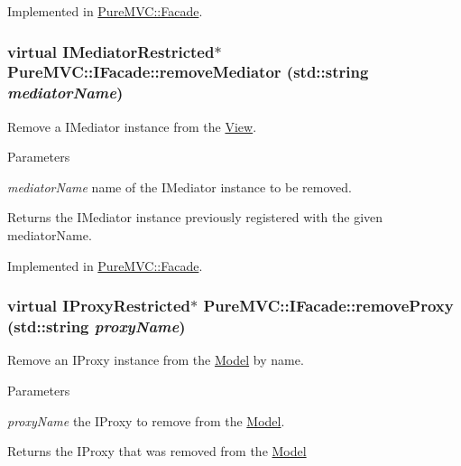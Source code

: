 Implemented in \hyperlink{class_pure_m_v_c_1_1_facade_aa99976fe908bef0b08642906b02e2af3}{PureMVC::Facade}.\hypertarget{class_pure_m_v_c_1_1_i_facade_a216510b6052c29a37b810c3cbdeeca7c}{
\subsubsection[{removeMediator}]{\setlength{\rightskip}{0pt plus 5cm}virtual {\bf IMediatorRestricted}$\ast$ PureMVC::IFacade::removeMediator (std::string {\em mediatorName})}}
\label{class_pure_m_v_c_1_1_i_facade_a216510b6052c29a37b810c3cbdeeca7c}


Remove a {\ttfamily IMediator} instance from the {\ttfamily \hyperlink{class_pure_m_v_c_1_1_view}{View}}. 
\begin{DoxyParams}{Parameters}
\item[{\em mediatorName}]name of the {\ttfamily IMediator} instance to be removed. \end{DoxyParams}
\begin{DoxyReturn}{Returns}
the {\ttfamily IMediator} instance previously registered with the given {\ttfamily mediatorName}. 
\end{DoxyReturn}


Implemented in \hyperlink{class_pure_m_v_c_1_1_facade_a0ddae3c399fc7cb393596f8b13792790}{PureMVC::Facade}.\hypertarget{class_pure_m_v_c_1_1_i_facade_ad4bab4e894ac4acd0b0f790dda21e8fe}{
\subsubsection[{removeProxy}]{\setlength{\rightskip}{0pt plus 5cm}virtual {\bf IProxyRestricted}$\ast$ PureMVC::IFacade::removeProxy (std::string {\em proxyName})}}
\label{class_pure_m_v_c_1_1_i_facade_ad4bab4e894ac4acd0b0f790dda21e8fe}


Remove an {\ttfamily IProxy} instance from the {\ttfamily \hyperlink{class_pure_m_v_c_1_1_model}{Model}} by name. 
\begin{DoxyParams}{Parameters}
\item[{\em proxyName}]the {\ttfamily IProxy} to remove from the {\ttfamily \hyperlink{class_pure_m_v_c_1_1_model}{Model}}. \end{DoxyParams}
\begin{DoxyReturn}{Returns}
the {\ttfamily IProxy} that was removed from the {\ttfamily \hyperlink{class_pure_m_v_c_1_1_model}{Model}} 
\end{DoxyReturn}


